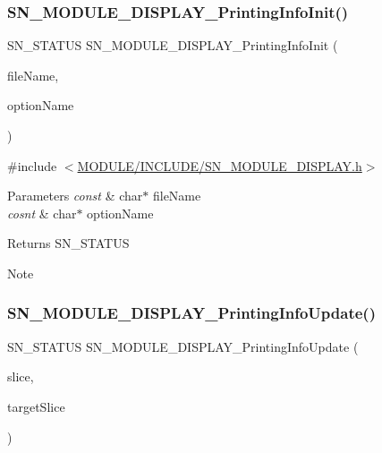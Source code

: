 \subsubsection{\texorpdfstring{S\+N\+\_\+\+M\+O\+D\+U\+L\+E\+\_\+\+D\+I\+S\+P\+L\+A\+Y\+\_\+\+Printing\+Info\+Init()}{SN\_MODULE\_DISPLAY\_PrintingInfoInit()}}
{\footnotesize\ttfamily S\+N\+\_\+\+S\+T\+A\+T\+US S\+N\+\_\+\+M\+O\+D\+U\+L\+E\+\_\+\+D\+I\+S\+P\+L\+A\+Y\+\_\+\+Printing\+Info\+Init (\begin{DoxyParamCaption}\item[{const char $\ast$}]{file\+Name,  }\item[{const char $\ast$}]{option\+Name }\end{DoxyParamCaption})}



{\ttfamily \#include $<$\hyperlink{SN__MODULE__DISPLAY_8h}{M\+O\+D\+U\+L\+E/\+I\+N\+C\+L\+U\+D\+E/\+S\+N\+\_\+\+M\+O\+D\+U\+L\+E\+\_\+\+D\+I\+S\+P\+L\+A\+Y.\+h}$>$}


\begin{DoxyParams}{Parameters}
{\em const} & char$\ast$ file\+Name \\
\hline
{\em cosnt} & char$\ast$ option\+Name \\
\hline
\end{DoxyParams}
\begin{DoxyReturn}{Returns}
S\+N\+\_\+\+S\+T\+A\+T\+US 
\end{DoxyReturn}
\begin{DoxyNote}{Note}

\end{DoxyNote}
\mbox{\label{group__DISPLAY_ga943b965a7a2e59a6c9f035c74c2c8735}} 
\subsubsection{\texorpdfstring{S\+N\+\_\+\+M\+O\+D\+U\+L\+E\+\_\+\+D\+I\+S\+P\+L\+A\+Y\+\_\+\+Printing\+Info\+Update()}{SN\_MODULE\_DISPLAY\_PrintingInfoUpdate()}}
{\footnotesize\ttfamily S\+N\+\_\+\+S\+T\+A\+T\+US S\+N\+\_\+\+M\+O\+D\+U\+L\+E\+\_\+\+D\+I\+S\+P\+L\+A\+Y\+\_\+\+Printing\+Info\+Update (\begin{DoxyParamCaption}\item[{uint32\+\_\+t}]{slice,  }\item[{uint32\+\_\+t}]{target\+Slice }\end{DoxyParamCaption})}



